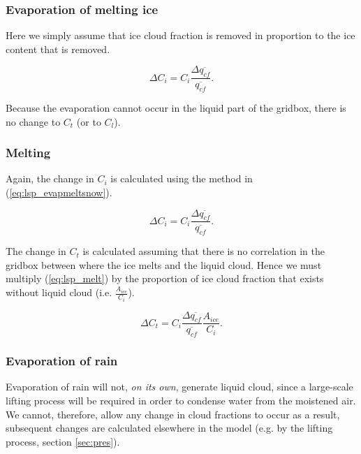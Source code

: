 \documentclass{UMDP_article}
\begin{document}
\subsubsection{Evaporation of melting ice}
Here we simply assume that ice cloud fraction is removed in proportion to the
ice content that is removed.

\begin{equation}
\Delta C_i = C_i \frac{ \Delta \overline{q_{cf}}}{\overline{q_{cf}}} .
\label{eq:lsp_evapmeltsnow}
\end{equation}

Because the evaporation cannot occur in the liquid part of the gridbox,
there is no change to $C_t$ (or to $C_l$). 

\subsubsection{Melting}
Again, the change in $C_i$ is calculated using the method
in (\ref{eq:lsp_evapmeltsnow}).

\begin{equation}
\Delta C_i = C_i \frac{ \Delta \overline{q_{cf}}}{\overline{q_{cf}}} .
\label{eq:lsp_melt}
\end{equation}

The change in $C_t$ is calculated assuming that there is no correlation
in the gridbox between where the ice melts and the liquid cloud. Hence
we must multiply (\ref{eq:lsp_melt}) by the proportion of ice cloud
fraction that exists without liquid cloud (i.e. $\frac{A_{ice}}{C_i}$).

\begin{equation}
\Delta C_t = C_i \frac{ \Delta \overline{q_{cf}}}{\overline{q_{cf}}}
\frac{A_{ice}}{C_i} .
\label{eq:lsp_melt2}
\end{equation}

\subsubsection{Evaporation of rain}
Evaporation of rain will not, \textit{on its own},
generate liquid cloud, since a
large-scale lifting process will be required in order to condense water
from the moistened air. We cannot, therefore, allow any change in cloud
fractions to occur as a result, subsequent changes are calculated elsewhere
in the model (e.g. by the lifting process, section \ref{sec:pres}).
\end{document}
